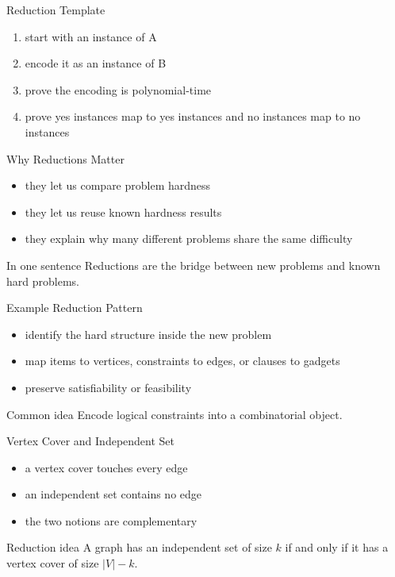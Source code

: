 \documentclass[aspectratio=169,xcolor=dvipsnames]{beamer}
\begin{document}
\begin{frame}{Reduction Template}
  \begin{enumerate}
    \item start with an instance of A
    \item encode it as an instance of B
    \item prove the encoding is polynomial-time
    \item prove yes instances map to yes instances and no instances map to no instances
  \end{enumerate}
\end{frame}

\begin{frame}{Why Reductions Matter}
  \begin{itemize}
    \item they let us compare problem hardness
    \item they let us reuse known hardness results
    \item they explain why many different problems share the same difficulty
  \end{itemize}
  \begin{exampleblock}{In one sentence}
    Reductions are the bridge between new problems and known hard problems.
  \end{exampleblock}
\end{frame}

\begin{frame}{Example Reduction Pattern}
  \begin{itemize}
    \item identify the hard structure inside the new problem
    \item map items to vertices, constraints to edges, or clauses to gadgets
    \item preserve satisfiability or feasibility
  \end{itemize}
  \begin{block}{Common idea}
    Encode logical constraints into a combinatorial object.
  \end{block}
\end{frame}

\begin{frame}{Vertex Cover and Independent Set}
  \begin{itemize}
    \item a vertex cover touches every edge
    \item an independent set contains no edge
    \item the two notions are complementary
  \end{itemize}
  \begin{exampleblock}{Reduction idea}
    A graph has an independent set of size $k$ if and only if it has a vertex cover of size $|V|-k$.
  \end{exampleblock}
\end{frame}
\end{document}

